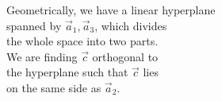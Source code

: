 \documentclass[preview]{standalone}
\begin{document}
\begin{center}
Geometrically, we have a linear hyperplane\\spanned by $\vec{a}_1,\vec{a}_3$, which divides\\the whole space into two parts.\\We are finding $\vec{c}$ orthogonal to\\the hyperplane such that $\vec{c}$ lies\\on the same side as $\vec{a}_2$.
\end{center}
\end{document}
